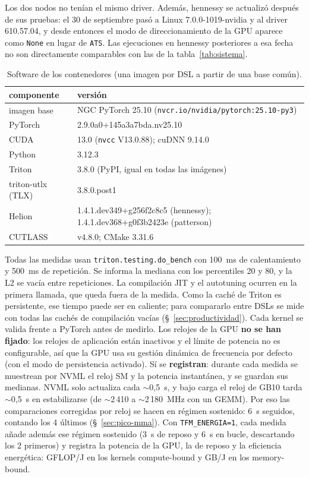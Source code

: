 Los dos nodos no tenían el mismo driver. Además, hennessy se actualizó después de sus
pruebas: el 30 de septiembre pasó a Linux 7.0.0-1019-nvidia y al driver 610.57.04, y desde
entonces el modo de direccionamiento de la GPU aparece como \texttt{None} en lugar de
\texttt{ATS}. Las ejecuciones en hennessy posteriores a esa fecha no son directamente
comparables con las de la tabla~\ref{tab:sistema}.

\begin{table}[htbp]
  \centering\small
  \begin{tabularx}{\linewidth}{lX}
    \toprule
    componente & versión \\
    \midrule
    imagen base & NGC PyTorch 25.10 (\texttt{nvcr.io/nvidia/pytorch:25.10-py3}) \\
    PyTorch & 2.9.0a0+145a3a7bda.nv25.10 \\
    CUDA & 13.0 (\texttt{nvcc} V13.0.88); cuDNN 9.14.0 \\
    Python & 3.12.3 \\
    Triton & 3.8.0 (PyPI, igual en todas las imágenes) \\
    triton-utlx (TLX) & 3.8.0.post1 \\
    Helion & 1.4.1.dev349+g256f2c8c5 (hennessy); 1.4.1.dev368+g0f3b2423e (patterson) \\
    CUTLASS & v4.8.0; CMake 3.31.6 \\
    \bottomrule
  \end{tabularx}
  \caption{Software de los contenedores (una imagen por DSL a partir de una base común).}
  \label{tab:contenedores}
\end{table}

Todas las medidas usan \texttt{triton.testing.do\_bench} con 100~ms de calentamiento y
500~ms de repetición. Se informa la mediana con los percentiles 20 y 80, y la L2 se vacía
entre repeticiones. La compilación JIT y el autotuning ocurren en la primera llamada, que
queda fuera de la medida. Como la caché de Triton es persistente, ese tiempo puede ser en caliente;
para compararlo entre DSLs se mide con todas las cachés de compilación vacías
(§~\ref{sec:productividad}). Cada kernel se valida frente a PyTorch antes de medirlo. Los
relojes de la GPU \textbf{no se han fijado}: los relojes de aplicación están inactivos y el
límite de potencia no es configurable, así que la GPU usa su gestión dinámica de frecuencia
por defecto (con el modo de persistencia activado). Sí se \textbf{registran}: durante cada medida se muestrean por
NVML el reloj SM y la potencia instantánea, y se guardan sus medianas. NVML solo actualiza cada
$\sim$0{,}5~s, y bajo carga el reloj de GB10 tarda $\sim$0{,}5~s en estabilizarse (de
$\sim$2\,410 a $\sim$2\,180~MHz con un GEMM). Por eso las comparaciones corregidas por reloj se
hacen en régimen sostenido: 6~s seguidos, contando los 4 últimos (§~\ref{sec:pico-mma}).
Con \texttt{TFM\_ENERGIA=1}, cada medida añade además ese régimen sostenido (3~s de reposo y
6~s en bucle, descartando los 2 primeros) y registra la potencia de la GPU, la de reposo y la
eficiencia energética: GFLOP/J en los kernels compute-bound y GB/J en los memory-bound.

